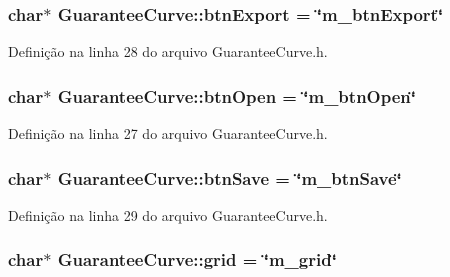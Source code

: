 \subsubsection[{btn\+Export}]{\setlength{\rightskip}{0pt plus 5cm}char$\ast$ Guarantee\+Curve\+::btn\+Export = \char`\"{}m\+\_\+btn\+Export\char`\"{}\hspace{0.3cm}{\ttfamily [protected]}}\label{class_guarantee_curve_abfb24cda6cdcdbc6beada370aa315c4e}


Definição na linha 28 do arquivo Guarantee\+Curve.\+h.

\subsubsection[{btn\+Open}]{\setlength{\rightskip}{0pt plus 5cm}char$\ast$ Guarantee\+Curve\+::btn\+Open = \char`\"{}m\+\_\+btn\+Open\char`\"{}\hspace{0.3cm}{\ttfamily [protected]}}\label{class_guarantee_curve_abb9f14e913b8309301093a4d2d76fb95}


Definição na linha 27 do arquivo Guarantee\+Curve.\+h.

\subsubsection[{btn\+Save}]{\setlength{\rightskip}{0pt plus 5cm}char$\ast$ Guarantee\+Curve\+::btn\+Save = \char`\"{}m\+\_\+btn\+Save\char`\"{}\hspace{0.3cm}{\ttfamily [protected]}}\label{class_guarantee_curve_a2c4e37586086a0d4b6710c221bf7cced}


Definição na linha 29 do arquivo Guarantee\+Curve.\+h.

\subsubsection[{grid}]{\setlength{\rightskip}{0pt plus 5cm}char$\ast$ Guarantee\+Curve\+::grid = \char`\"{}m\+\_\+grid\char`\"{}\hspace{0.3cm}{\ttfamily [protected]}}\label{class_guarantee_curve_adc877ae460b060263b5ba691e96495ba}



